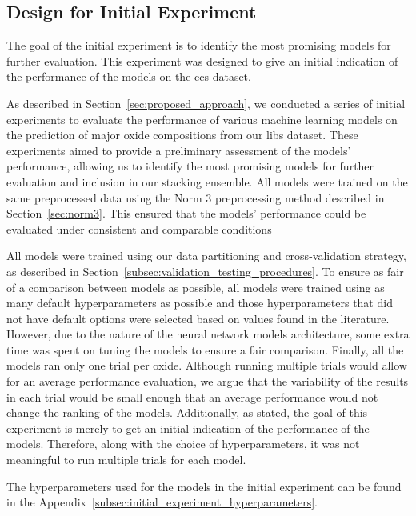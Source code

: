 \subsection{Design for Initial Experiment}\label{sec:initial-experiment}
The goal of the initial experiment is to identify the most promising models for further evaluation.
This experiment was designed to give an initial indication of the performance of the models on the \gls{ccs} dataset.

As described in Section~\ref{sec:proposed_approach}, we conducted a series of initial experiments to evaluate the performance of various machine learning models on the prediction of major oxide compositions from our \gls{libs} dataset.
These experiments aimed to provide a preliminary assessment of the models' performance, allowing us to identify the most promising models for further evaluation and inclusion in our stacking ensemble.
All models were trained on the same preprocessed data using the Norm 3 preprocessing method described in Section~\ref{sec:norm3}.
This ensured that the models' performance could be evaluated under consistent and comparable conditions

All models were trained using our data partitioning and cross-validation strategy, as described in Section~\ref{subsec:validation_testing_procedures}. 
To ensure as fair of a comparison between models as possible, all models were trained using as many default hyperparameters as possible and those hyperparameters that did not have default options were selected based on values found in the literature.
However, due to the nature of the neural network models architecture, some extra time was spent on tuning the models to ensure a fair comparison.
Finally, all the models ran only one trial per oxide. 
Although running multiple trials would allow for an average performance evaluation, we argue that the variability of the results in each trial would be small enough that an average performance would not change the ranking of the models. 
Additionally, as stated, the goal of this experiment is merely to get an initial indication of the performance of the models.
Therefore, along with the choice of hyperparameters, it was not meaningful to run multiple trials for each model.

The hyperparameters used for the models in the initial experiment can be found in the Appendix~\ref{subsec:initial_experiment_hyperparameters}.